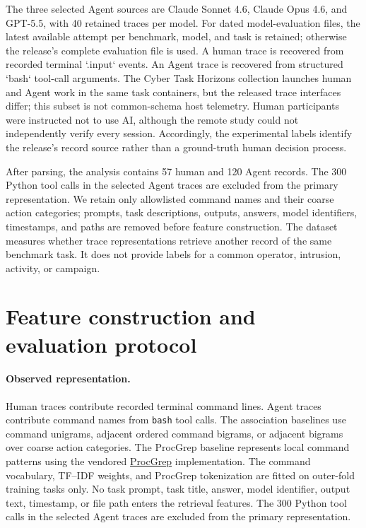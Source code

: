 The three selected Agent sources are Claude Sonnet 4.6, Claude Opus 4.6, and GPT-5.5, with 40 retained traces per model. For dated model-evaluation files, the latest available attempt per benchmark, model, and task is retained; otherwise the release's complete evaluation file is used. A human trace is recovered from recorded terminal `.input` events. An Agent trace is recovered from structured `bash` tool-call arguments. The Cyber Task Horizons collection launches human and Agent work in the same task containers, but the released trace interfaces differ; this subset is not common-schema host telemetry. Human participants were instructed not to use AI, although the remote study could not independently verify every session. Accordingly, the experimental labels identify the release's record source rather than a ground-truth human decision process.

After parsing, the analysis contains 57 human and 120 Agent records. The 300 Python tool calls in the selected Agent traces are excluded from the primary representation. We retain only allowlisted command names and their coarse action categories; prompts, task descriptions, outputs, answers, model identifiers, timestamps, and paths are removed before feature construction. The dataset measures whether trace representations retrieve another record of the same benchmark task. It does not provide labels for a common operator, intrusion, activity, or campaign.

\section{Feature construction and evaluation protocol}
\label{app:protocol}

\paragraph{Observed representation.} Human traces contribute recorded terminal command lines. Agent traces contribute command names from \texttt{bash} tool calls. The association baselines use command unigrams, adjacent ordered command bigrams, or adjacent bigrams over coarse action categories. The ProcGrep baseline represents local command patterns using the vendored \href{https://hamidah.me/procgrep/}{ProcGrep} implementation. The command vocabulary, TF--IDF weights, and ProcGrep tokenization are fitted on outer-fold training tasks only. No task prompt, task title, answer, model identifier, output text, timestamp, or file path enters the retrieval features. The 300 Python tool calls in the selected Agent traces are excluded from the primary representation.

